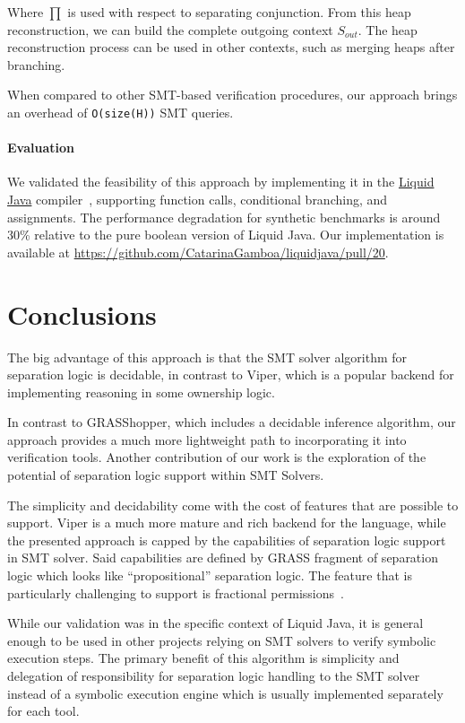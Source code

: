 \documentclass[sigplan,screen,review]{acmart}
\begin{document}
Where $\prod$ is used with respect to separating conjunction. From this heap reconstruction, we can build the complete outgoing context $S_{out}$. The heap reconstruction process can be used in other contexts, such as merging heaps after branching.

When compared to other SMT-based verification procedures, our approach brings an overhead of \texttt{O(size(H))} SMT queries.

\paragraph{Evaluation} We validated the feasibility of this approach by implementing it in the \href{https://catarinagamboa.github.io/liquidjava.html}{Liquid Java} compiler~\cite{gamboa2021user}, supporting function calls, conditional branching, and assignments. The performance degradation for synthetic benchmarks is around 30\% relative to the pure boolean version of Liquid Java. Our implementation is available at \url{https://github.com/CatarinaGamboa/liquidjava/pull/20}.



\section{Conclusions}

The big advantage of this approach is that the SMT solver algorithm for separation logic is decidable, in contrast to Viper\cite{DBLP:conf/vmcai/0001SS16}, which is a popular backend for implementing reasoning in some ownership logic. 

In contrast to GRASShopper\cite{piskac2014grasshopper}, which includes a decidable inference algorithm, our approach provides a much more lightweight path to incorporating it into verification tools. Another contribution of our work is the exploration of the potential of separation logic support within SMT Solvers.


The simplicity and decidability come with the cost of features that are possible to support. Viper is a much more mature and rich backend for the language, while the presented approach is capped by the capabilities of separation logic support in SMT solver. Said capabilities are defined by GRASS fragment of separation logic which looks like ``propositional'' separation logic. The feature that is particularly challenging to support is fractional permissions~\cite{DBLP:conf/sas/Boyland03}. 

While our validation was in the specific context of Liquid Java, it is general enough to be used in other projects relying on SMT solvers to verify symbolic execution steps. The primary benefit of this algorithm is simplicity and delegation of responsibility for separation logic handling to the SMT solver instead of a symbolic execution engine which is usually implemented separately for each tool. 




\end{document}
